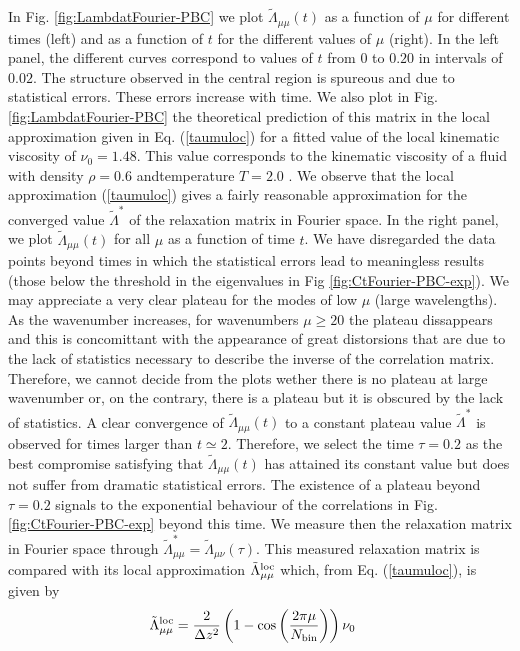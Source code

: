 \documentclass[a4paper,openright,12pt]{book}
\newcommand{\Pendiente}[1]{{\color{green}#1}} %
\begin{document}
In       Fig.         \ref{fig:LambdatFourier-PBC}       we       plot
$\tilde{\Lambda}_{\mu\mu}(t)$  as a  function of  $\mu$ for  different
times (left) and as a function of $t$ for the different values of $\mu$
(right). In the left panel,  the different curves correspond to values
of  $t$ from  $0$ to  $0.20$ in  intervals of  $0.02$.  The  structure
observed  in the  central region  is spureous  and due  to statistical
errors.   These   errors  increase  with   time.   We  also   plot  in
Fig. \ref{fig:LambdatFourier-PBC}  the theoretical prediction  of this
matrix in the local approximation  given in Eq. (\ref{taumuloc}) for a
fitted value  of the  local kinematic  viscosity of  $\nu_0=1.48$. \Pendiente{This value corresponds to the kinematic viscosity of a fluid with density $\rho=0.6$ andtemperature $T=2.0$ \cite{Woodcock2006}}.  We
observe that  the local approximation (\ref{taumuloc})  gives a fairly
reasonable approximation  for the converged  value $\tilde{\Lambda}^*$
of the  relaxation matrix in Fourier  space.  In the right  panel, we
plot $\tilde{\Lambda}_{\mu\mu}(t)$ for all $\mu$ as a function of time
$t$.  We  have disregarded the data  points beyond times in  which the
statistical  errors  lead  to  meaningless results  (those  below  the
threshold  in  the  eigenvalues  in Fig  \ref{fig:CtFourier-PBC-exp}).   We  may
appreciate a  very clear  plateau for  the modes  of low  $\mu$ (large
wavelengths).  As the wavenumber increases, for wavenumbers $\mu\ge20$
the plateau dissappears  and this is concomittant  with the appearance
of great distorsions that are due  to the lack of statistics necessary
to describe  the inverse  of the correlation matrix.  Therefore, we  cannot decide
from the plots  wether there is no plateau at  large wavenumber or, on
the contrary,  there is a  plateau but it is  obscured by the  lack of
statistics.  A clear convergence of $\tilde{\Lambda}_{\mu\mu}(t)$ to a
constant  plateau  value  $\tilde{\Lambda}^*$ is  observed  for  times
larger than $t\simeq  2$. Therefore, we select the  time $\tau=0.2$ as
the best compromise  satisfying that $\tilde{\Lambda}_{\mu\mu}(t)$ has
attained  its  constant  value  but  does  not  suffer  from  dramatic
statistical errors.     The existence  of a  plateau
beyond  $\tau=0.2$  signals  to   the  exponential  behaviour  of  the
correlations  in  Fig.   \ref{fig:CtFourier-PBC-exp}  beyond  this  time.   We
measure  then   the  relaxation   matrix  in  Fourier   space  through
$\tilde{\Lambda}^*_{\mu\mu}=\tilde{\Lambda}_{\mu\nu}(\tau)$.      This
measured relaxation  matrix is  compared with its  local approximation
$\tilde{\Lambda}^{\rm loc}_{\mu\mu}$ which, from Eq. (\ref{taumuloc}),
is given by
\begin{align}
\tilde{\Lambda}^{\rm loc}_{\mu\mu}&=\frac{2}{\Delta z^2}
\left(1-\cos\left( \frac{2\pi \mu}{N_{\rm bin}}\right)\right)
\nu_0
\label{Lambdaloc}
\end{align}
\end{document}
